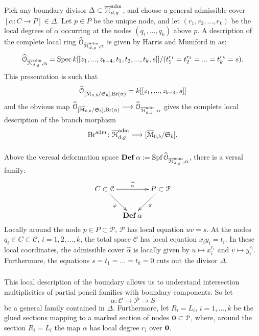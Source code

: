 \documentclass[reqno, 10 pt]{article}
\theoremstyle{definition}
\theoremstyle{remark}
\numberwithin{equation}{section}
\numberwithin{thm}{section}
\numberwithin{prop}{section}
\numberwithin{lem}{section}
\numberwithin{cor}{section}
\numberwithin{conj}{section}
\numberwithin{defn}{section}
\newcommand{\M}{\mathcal M}
\renewcommand{\H}{\mathcal H}
\newcommand{\Hdg}{\overline{\H}_{d,g}}
\renewcommand{\to}{\longrightarrow}
\newcommand{\cC}{{\mathcal C}}
\newcommand{\cO}{{\mathcal O}}
\newcommand{\cP}{{\mathcal P}}
\newcommand {\from}{{\colon}}
\newcommand{\compl}[1]{\widehat{#1}}
\newcommand{\Br}{{\rm Br}}
\renewcommand{\H}{{\mathcal{H}}}
\newcommand{\Spec}{{\text{\rm Spec}\,}}
\newcommand{\Spf}{{\text{\rm Spf}\,}}
\begin{document}
  \subsubsection{}
    Pick any boundary divisor $\Delta \subset \Hdg^{\rm{adm}}$, and choose a general admissible cover $[\alpha \colon C \longrightarrow P] \in \Delta$.  Let $p \in P$ be the unique node, and let $(r_1,r_2,...,r_k)$ be the local degrees of $\alpha$ occurring at the nodes $(q_1,...,q_k)$ above $p$.  A description of the complete local ring $\compl{\cO}_{\Hdg^{\rm{adm}}, \alpha}$ is given by Harris and Mumford in \cite{Harris82:_Kodair_Dimen_Of_Modul_Space_Of_Curves} as: 
    \[\compl{\cO}_{\Hdg^{\rm{adm}}, \alpha} = \Spec k[[z_{1}, ... , z_{b-4}, t_1,t_2, ... , t_k, s]]/ (t_1^{r_1} = t_2^{r_2} = ... = t_k^{r_k} = s).\] This presentation is such that  \[\compl{\cO}_{[\o{\M}_{0,b}/\mathfrak{S}_{b}], \Br(\alpha)} = k[[z_{1}, ... ,z_{b-4}, s]]\] and the obvious map $\compl{\cO}_{[\o{\M}_{0,b}/\mathfrak{S}_{b}], \Br(\alpha)} \to \compl{\cO}_{\Hdg^{\rm{adm}}, \alpha}$ gives the complete local description of the branch morphism \[\Br^{\rm{adm}} \from \Hdg^{\rm{adm}} \to [\overline{\M}_{0,b}/\mathfrak{S}_{b}].\]

  \subsubsection{} \label{localcoordinates} 
    Above the veresal deformation space ${\bf Def}\, \alpha := \Spf{\compl{\cO}_{\Hdg^{\rm{adm}}, \alpha}}$, there is a versal family: 
     \begin{equation*}   
    \xymatrix @C -1.5pc  {
    C \subset \mathcal{\cC} \ar[rr]^{\compl{\alpha}} \ar[rd]_\varphi&&
    {P} \subset \mathcal{\cP} \ar[ld]^\pi \\
    &{\bf Def}\, \alpha}
     \end{equation*} 
     Locally around the node $p \in {P} \subset \cP$, $\cP$ has local equation $uv=s$.  At the nodes $q_{i} \in C \subset \cC$, $i = 1,2,...,k$, the total space $\cC$ has local equation $x_i y_i = t_i$.  In these local coordinates, the admissible cover $\compl{\alpha}$ is locally given by $u \mapsto x_{i}^{r_{i}}$ and $v \mapsto y_{i}^{r_{i}}$. Furthermore, the equations $s = t_{1} =  ... = t_{k} = 0$ cuts out the divisor $\Delta$.

  \subsubsection{} 
     This local description of the boundary allows us to understand intersection multiplicities of partial pencil families with boundary components. So let 
     \[\alpha \from \cC \to \cP \to S\] be a general family contained in $\Delta$. Furthermore, let $R_{i} = L_{i}$, $i=1,...,k$ be the glued sections mapping to a marked section of nodes ${\bf 0} \subset \cP$, where, around the section $R_{i} = L_{i}$ the map $\alpha$ has local degree $r_{i}$ over ${\bf 0}$.  
     
\end{document}

